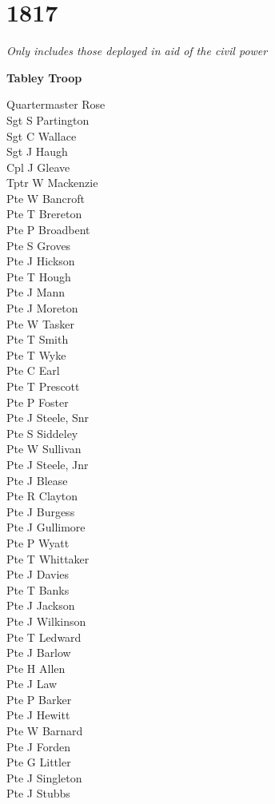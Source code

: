 \chapter*{1817}

\begin{center}
  \textit{Only includes those deployed in aid of the civil power}
\end{center}

\begin{center}
  \Large
  \textbf{Tabley Troop}
\end{center}

\begin{multicols}{2}
  \noindent
  Quartermaster Rose \\
  Sgt S Partington \\
  Sgt C Wallace \\
  Sgt J Haugh \\
  Cpl J Gleave \\
  Tptr W Mackenzie \\
  Pte W Bancroft \\
  Pte T Brereton \\
  Pte P Broadbent \\
  Pte S Groves \\
  Pte J Hickson \\
  Pte T Hough \\
  Pte J Mann \\
  Pte J Moreton \\
  Pte W Tasker \\
  Pte T Smith \\
  Pte T Wyke \\
  Pte C Earl \\
  Pte T Prescott \\
  Pte P Foster \\
  Pte J Steele, Snr \\
  Pte S Siddeley \\
  Pte W Sullivan \\
  Pte J Steele, Jnr \\
  Pte J Blease \\
  Pte R Clayton \\
  Pte J Burgess \\
  Pte J Gullimore \\
  Pte P Wyatt \\
  Pte T Whittaker \\
  Pte J Davies \\
  Pte T Banks \\
  Pte J Jackson \\
  Pte J Wilkinson \\
  Pte T Ledward \\
  Pte J Barlow \\
  Pte H Allen \\
  Pte J Law \\
  Pte P Barker \\
  Pte J Hewitt \\
  Pte W Barnard \\
  Pte J Forden \\
  Pte G Littler \\
  Pte J Singleton \\
  Pte J Stubbs \\
\end{multicols}
